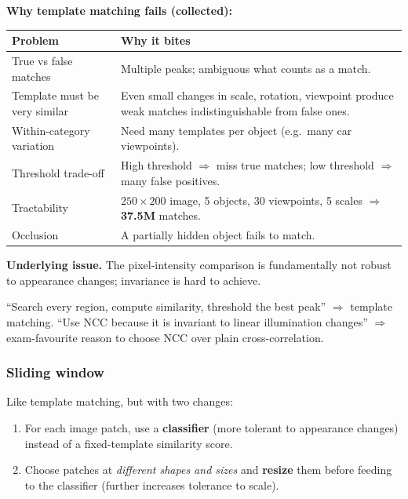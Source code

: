 \separator

\textbf{Why template matching fails (collected):}

\begin{center}
\renewcommand{\arraystretch}{1.3}
\begin{tabular}{@{} l p{8.5cm} @{}}
\toprule
\textbf{Problem} & \textbf{Why it bites} \\
\midrule
True vs false matches & Multiple peaks; ambiguous what counts as a match. \\
Template must be very similar & Even small changes in scale, rotation, viewpoint produce weak matches indistinguishable from false ones. \\
Within-category variation & Need many templates per object (e.g.\ many car viewpoints). \\
Threshold trade-off & High threshold $\Rightarrow$ miss true matches; low threshold $\Rightarrow$ many false positives. \\
Tractability & $250\!\times\!200$ image, 5 objects, 30 viewpoints, 5 scales $\Rightarrow$ \textbf{37.5M} matches. \\
Occlusion & A partially hidden object fails to match. \\
\bottomrule
\end{tabular}
\end{center}

\textbf{Underlying issue.} The pixel-intensity comparison is fundamentally not robust to appearance changes; invariance is hard to achieve.

\begin{tipbox}
``Search every region, compute similarity, threshold the best peak'' $\Rightarrow$ template matching. ``Use NCC because it is invariant to linear illumination changes'' $\Rightarrow$ exam-favourite reason to choose NCC over plain cross-correlation.
\end{tipbox}

\bigseparator

\subsubsection{Sliding window}

\begin{defbox}
Like template matching, but with two changes:
\begin{enumerate}
  \item For each image patch, use a \textbf{classifier} (more tolerant to appearance changes) instead of a fixed-template similarity score.
  \item Choose patches at \emph{different shapes and sizes} and \textbf{resize} them before feeding to the classifier (further increases tolerance to scale).
\end{enumerate}
\end{defbox}


